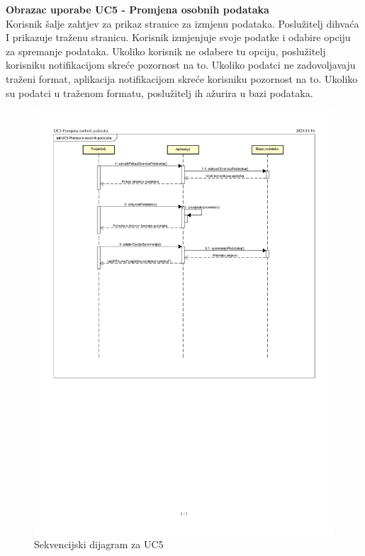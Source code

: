 				
				\eject
	
				
				
				\textbf{\large Obrazac uporabe UC5 - Promjena osobnih podataka}\\


				Korisnik šalje zahtjev za prikaz stranice za izmjenu podataka. Poslužitelj dihvaća I prikazuje traženu stranicu. Korisnik izmjenjuje svoje podatke i odabire opciju za spremanje podataka. Ukoliko korisnik ne odabere tu opciju, poslužitelj korisniku notifikacijom skreće pozornost na to. Ukoliko podatci ne zadovoljavaju traženi format, aplikacija notifikacijom skreće korisniku pozornost na to. Ukoliko su podatci u traženom formatu, poslužitelj ih ažurira u bazi podataka.
				\begin{figure}[H]
						\includegraphics[scale=0.7]{slike/uc5-1.PNG} %
						\centering
						\caption{Sekvencijski dijagram za UC5}
						\label{fig:promjene}
				\end{figure}

